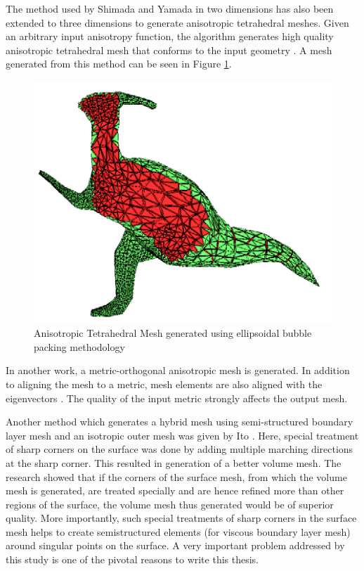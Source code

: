 The method used by Shimada and Yamada in two dimensions has also been extended to three dimensions to generate anisotropic tetrahedral meshes. Given an arbitrary input anisotropy function, the algorithm generates high quality anisotropic tetrahedral mesh that conforms to the input geometry \cite{yamakawa2000high}. A mesh generated from this method can be seen in Figure \ref{fig-yamakawa}.

\begin{figure}
	\centering
	\includegraphics[width=0.5\linewidth]{img/intro/lit/highQualityTetMesh.png}
	\caption{Anisotropic Tetrahedral Mesh generated using ellipsoidal bubble packing methodology  \cite{yamakawa2000high}}
	\label{fig-yamakawa}
\end{figure}

In another work, a metric-orthogonal anisotropic mesh is generated. In addition to aligning the mesh to a metric, mesh elements are also aligned with the eigenvectors \cite{loseille20093d}. The quality of the input metric strongly affects the output mesh.

Another method which generates a hybrid mesh using semi-structured boundary layer mesh and an isotropic outer mesh was given by Ito \etal \cite{ito2007multiple}. Here, special treatment of sharp corners on the surface was done by adding multiple marching directions at the sharp corner. This resulted in generation of a better volume mesh. The research showed that if the corners of the surface mesh, from which the volume mesh is generated, are treated specially and are hence refined more than other regions of the surface, the volume mesh thus generated would be of superior quality. More importantly, such special treatments of sharp corners in the surface mesh helps to create semistructured elements (for viscous boundary layer mesh) around singular points on the surface. A very important problem addressed by this study is one of the pivotal reasons to write this thesis.

